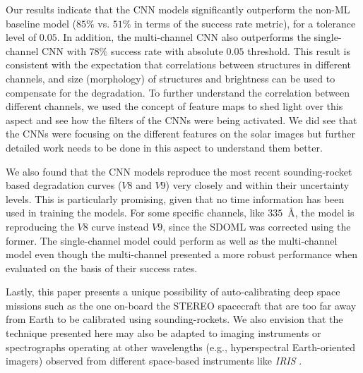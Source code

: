 \documentclass{aa}
\begin{document}
Our results indicate that the CNN models significantly outperform the non-ML baseline model ($85\%$ vs. $51\%$ in terms of the success rate metric), for a tolerance level of $0.05$. In addition, the multi-channel CNN also outperforms the single-channel CNN with $78\%$ success rate with absolute $0.05$ threshold. This result is consistent with the expectation that correlations between structures in different channels, and size (morphology) of structures and brightness can be used to compensate for the degradation. To further understand the correlation between different channels, we used the concept of feature maps to shed light over this aspect and see how the filters of the CNNs were being activated. We did see that the CNNs were focusing on the different features on the solar images but further detailed work needs to be done in this aspect to understand them better. 

We also found that the CNN models reproduce the most recent sounding-rocket based degradation curves ($V8$ and $V9$) very closely and within their uncertainty levels. This is particularly promising, given that no time information has been used in training the models. For some specific channels, like $335$~\AA, the model is reproducing the $V8$ curve instead $V9$, since the SDOML was corrected using the former. The single-channel model could perform as well as the multi-channel model even though the multi-channel presented a more robust performance when evaluated on the basis of their success rates.

Lastly, this paper presents a unique possibility of auto-calibrating deep space missions such as the one on-board the STEREO spacecraft that are too far away from Earth to be calibrated using sounding-rockets. We also envision that the technique presented here may also be adapted to imaging instruments or spectrographs operating at other wavelengths (e.g., hyperspectral Earth-oriented imagers) observed from different space-based instruments like \textit{IRIS} \citep[][]{2014SoPh..289.2733D}. 
\end{document}
